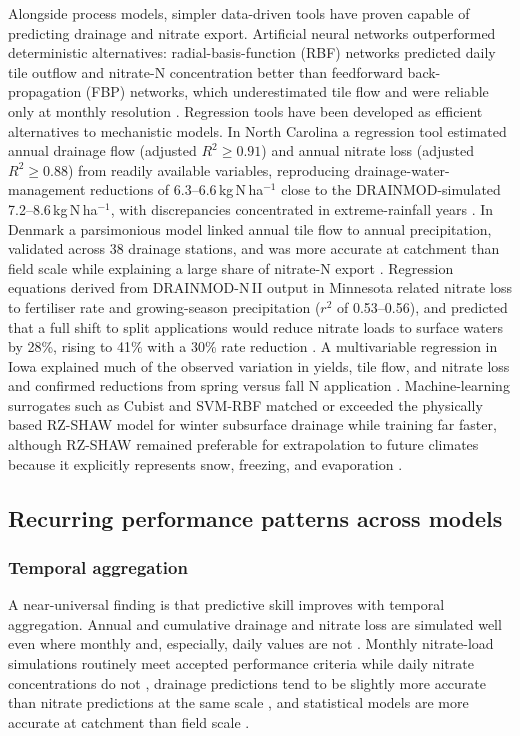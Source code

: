 Alongside process models, simpler data-driven tools have proven capable of predicting drainage and nitrate export. Artificial neural networks outperformed deterministic alternatives: radial-basis-function (RBF) networks predicted daily tile outflow and nitrate-N concentration better than feedforward back-propagation (FBP) networks, which underestimated tile flow and were reliable only at monthly resolution \parencite{Sharma2003,Rudra2005}. Regression tools have been developed as efficient alternatives to mechanistic models. In North Carolina a regression tool estimated annual drainage flow (adjusted $R^2 \geq 0.91$) and annual nitrate loss (adjusted $R^2 \geq 0.88$) from readily available variables, reproducing drainage-water-management reductions of 6.3--6.6\,kg\,N\,ha$^{-1}$ close to the DRAINMOD-simulated 7.2--8.6\,kg\,N\,ha$^{-1}$, with discrepancies concentrated in extreme-rainfall years \parencite{Negm2016}. In Denmark a parsimonious model linked annual tile flow to annual precipitation, validated across 38 drainage stations, and was more accurate at catchment than field scale while explaining a large share of nitrate-N export \parencite{Frederiksen2023}. Regression equations derived from DRAINMOD-N\,II output in Minnesota related nitrate loss to fertiliser rate and growing-season precipitation ($r^2$ of 0.53--0.56), and predicted that a full shift to split applications would reduce nitrate loads to surface waters by 28\%, rising to 41\% with a 30\% rate reduction \parencite{Wilson2020}. A multivariable regression in Iowa explained much of the observed variation in yields, tile flow, and nitrate loss and confirmed reductions from spring versus fall N application \parencite{Ahuja2007}. Machine-learning surrogates such as Cubist and SVM-RBF matched or exceeded the physically based RZ-SHAW model for winter subsurface drainage while training far faster, although RZ-SHAW remained preferable for extrapolation to future climates because it explicitly represents snow, freezing, and evaporation \parencite{Li2025}.

\subsection{Recurring performance patterns across models}

\subsubsection{Temporal aggregation}

A near-universal finding is that predictive skill improves with temporal aggregation. Annual and cumulative drainage and nitrate loss are simulated well even where monthly and, especially, daily values are not \parencite{Liang2018,Marjerison2016,Malone2017,Ojeda2018}. Monthly nitrate-load simulations routinely meet accepted performance criteria while daily nitrate concentrations do not \parencite{Ikenberry2017,Qi2025}, drainage predictions tend to be slightly more accurate than nitrate predictions at the same scale \parencite{Luo2010}, and statistical models are more accurate at catchment than field scale \parencite{Frederiksen2023}.

